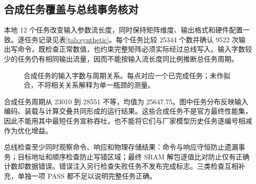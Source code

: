 \subsection{合成任务覆盖与总线事务核对}
本地 12 个任务改变输入参数流长度，同时保持矩阵维度、输出格式和硬件配置一致。逐任务记录见表\ref{tab:synthetic}。每个任务比较 25344 个数并确认 9522 次输出写命令，既检查正常数值，也约束完整矩阵必须实际经过总线写入。输入字数较少的任务仍有相同输出流量，因而不能按输入流长度同比例推断总任务周期。

\begin{table}[H]\centering\small
\caption{本地合成任务的已记录结果}\label{tab:synthetic}

\end{table}

\begin{figure}[H]\centering
{}
\caption{合成任务的输入字数与周期关系。每点对应一个已完成任务；未作拟合，不将相关关系解释为单一瓶颈的测量。}
\end{figure}

合成任务周期从 23010 到 28551 不等，均值为 25647.75。图中任务分布反映输入编码、装载与计算交叠共同形成的运行结果。这些合成任务不是官方最终性能集，因此不能用其中最短任务宣称吞吐，也不能将它们与厂家模型历史任务逐编号相减作为优化增益。

总线检查至少同时观察命令、响应和物理存储结果：命令与响应守恒防止遗漏事务；目标地址和顺序检查防止写错区域；最终 SRAM 解包逐值比对防止仅有正确计数却数据错误。错误注入另行检查失败任务不发布完成标志。三类检查互相补充，单独一项 PASS 都不足以说明完整任务正确。
